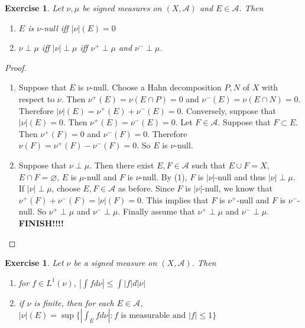 \documentclass[12pt]{amsart}
\newtheorem{ex}[thm]{Exercise}
\newcommand{\MA}{\mathcal{A}}
\begin{document}
\begin{ex}
	Let $\nu, \mu$ be signed measures on $(X,\MA)$ and $E \in \MA$. Then 
	\begin{enumerate}
		\item $E$ is $\nu$-null iff $|\nu|(E) = 0$
		\item $\nu \perp \mu$ iff $|\nu| \perp \mu$ iff $\nu^+ \perp \mu$ and $\nu^- \perp \mu$.
	\end{enumerate}
\end{ex}

\begin{proof}
	\begin{enumerate}
		\item Suppose that $E$ is $\nu$-null. Choose a Hahn decomposition $P,N$ of $X$ with respect to $\nu$. Then $\nu^+(E) = \nu(E \cap P) = 0$ and $\nu^-(E) = \nu(E \cap N) = 0$. Therefore $|\nu|(E) = \nu^+(E) + \nu^-(E) = 0$. Conversely, suppose that $|\nu|(E) = 0$. Then $\nu^+(E) = \nu^-(E) = 0$. Let $F \in \MA$. Suppose that $F \subset E$. Then $\nu^+(F) = 0$ and $\nu^-(F) = 0$. Therefore $\nu(F) = \nu^+(F) - \nu^-(F) = 0$. So $E$ is $\nu$-null.
		
		\item Suppose that $\nu \perp \mu$. Then there exist $E,F \in \MA$ such that $E \cup F = X$, $E \cap F = \varnothing$, $E$ is $\mu$-null and $F$ is $\nu$-null. By (1), $F$ is $|\nu|$-null and thus $|\nu| \perp \mu$. If $|\nu| \perp \mu$, choose $E,F \in \MA$ as before. Since $F$ is $|\nu|$-null, we know that $\nu^+(F) + \nu^-(F) = |\nu|(F) = 0$. This implies that $F$ is $\nu^+$-null and $F$ is $\nu^-$-null. So $\nu^+ \perp \mu$ and $\nu^- \perp \mu$. Finally assume that $\nu^+ \perp \mu$ and $\nu^- \perp \mu$. \textbf{FINISH!!!!}
		
	\end{enumerate}
\end{proof}

\begin{ex}
	Let $\nu$ be a signed measure on $(X, \MA)$. Then 
	\begin{enumerate}
		\item for $f \in L^1(\nu)$, $|\int f d \nu| \leq \int |f| d |\nu|$
		\item if $\nu$ is finite, then for each $E \in \MA$, $|\nu|(E) = \sup \{|\int_E f d \nu |: f  \text{ is measurable and } |f| \leq 1 \}$
	\end{enumerate}
\end{ex}
\end{document}
